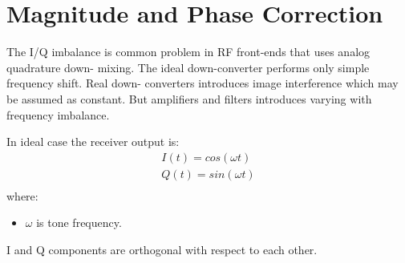 \documentclass[en,printmode]{mgr}
\begin{document}
	\section{Magnitude and Phase Correction}
		The I/Q imbalance is common problem in RF front-ends that uses analog quadrature down-
		mixing. The ideal down-converter performs only simple frequency shift. Real down-
	    converters introduces image interference which may be assumed as constant. But amplifiers
	    and filters introduces varying with frequency imbalance.
	    
	    In ideal case the receiver output is:
		\begin{equation}
			\renewcommand*{\arraystretch}{1.3} 
			\begin{array}{ll}
				I(t) = cos(\omega t) \\
				Q(t) = sin(\omega t) \\
			\end{array}
		\end{equation}
		where:
		\begin{itemize}
			\item $\omega$ is tone frequency.
		\end{itemize}
	    I and Q components are orthogonal with respect to each other.
	    
\end{document}

